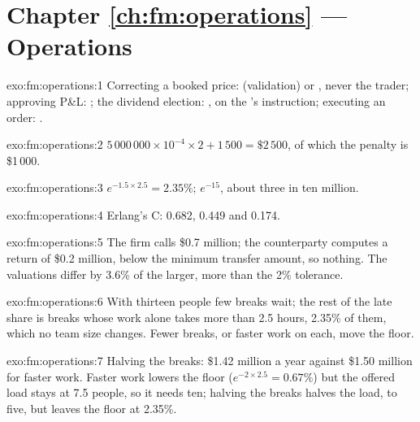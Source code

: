 \section*{Chapter \ref{ch:fm:operations} --- Operations}

\begin{solution}{exo:fm:operations:1}
Correcting a booked price:  (validation) or , never the trader; approving P\&L: ; the dividend election: , on the 's instruction; executing an order: .
\end{solution}

\begin{solution}{exo:fm:operations:2}
$5\,000\,000\times10^{-4}\times2+1\,500=\$2\,500$, of which the penalty is \$1\,000.
\end{solution}

\begin{solution}{exo:fm:operations:3}
$e^{-1.5\times2.5}=2.35\%$; $e^{-15}$, about three in ten million.
\end{solution}

\begin{solution}{exo:fm:operations:4}
Erlang's C: 0.682, 0.449 and 0.174.
\end{solution}

\begin{solution}{exo:fm:operations:5}
The firm calls \$0.7 million; the counterparty computes a return of \$0.2 million, below the minimum transfer amount, so nothing. The valuations
differ by 3.6\% of the larger, more than the 2\% tolerance.
\end{solution}

\begin{solution}{exo:fm:operations:6}
With thirteen people few breaks wait; the rest of the late share is breaks whose work alone takes more than 2.5 hours, 2.35\% of them, which no
team size changes. Fewer breaks, or faster work on each, move the floor.
\end{solution}

\begin{solution}{exo:fm:operations:7}
Halving the breaks: \$1.42 million a year against \$1.50 million for faster work. Faster work lowers the floor ($e^{-2\times2.5}=0.67\%$) but the
offered load stays at 7.5 people, so it needs ten; halving the breaks halves the load, to five, but leaves the floor at 2.35\%.
\end{solution}

